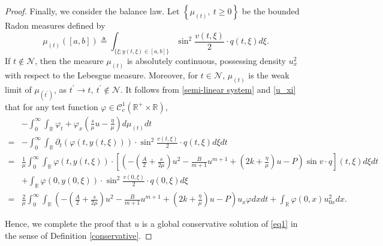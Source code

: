 \documentclass[10pt,a4paper]{amsart}
\begin{document}
\begin{proof}
		Finally, we consider the balance law. Let $\left\{\mu_{(t)},\ t\geq0\right\}$ be the bounded Radon measures defined by
		\begin{equation}
			\mu_{(t)}\left([a,b]\right)\triangleq\int_{\{\xi;y(t,\xi)\in[a,b]\}}\sin^2\frac{v(t,\xi)}{2}\cdot q(t,\xi)d\xi.
		\end{equation}
		If $t\notin\mathcal{N}$, then the measure $\mu_{(t)}$ is absolutely continuous, possessing density $u_x^2$ with respect to the Lebesgue measure. Moreover, for $t\in\mathcal{N}$, $\mu_{(t)}$ is the weak limit of $\mu_{(t^\prime)}$, as $t^\prime\to t,\ t^\prime\notin\mathcal{N}$. It follows from \eqref{semi-linear system} and \eqref{u_xi} that for any test function $\varphi\in\mathcal{C}_c^1(\mathbb{R}^+\times\mathbb{R})$,
		\begin{align*}
			&-\int_{0}^{\infty}\int_\mathbb{R}\varphi_t+\varphi_x\left(\frac{s}{\mu}u-\frac{\eta}{\mu}\right)d\mu_{(t)}dt\\
			=&-\int_{0}^{\infty}\int_\mathbb{R}\partial_t(\varphi(t,y(t,\xi)))\cdot\sin^2\frac{v(t,\xi)}{2}\cdot q(t,\xi)d\xi dt\\
			=&\frac{1}{\mu}\int_{0}^{\infty}\int_\mathbb{R}\varphi(t,y(t,\xi))\cdot\left[\left(-\left(\frac{A}{2}+\frac{s}{2\mu}\right)u^2-\frac{B}{m+1}u^{m+1}+\left(2k+\frac{\eta}{\mu}\right)u-P\right)\sin v\cdot q\right](t,\xi) d\xi dt\\
			&+\int_{\mathbb{R}}\varphi(0,y(0,\xi))\cdot\sin^2\frac{v(0,\xi)}{2}\cdot q(0,\xi)d\xi\\
			=&\frac{2}{\mu}\int_{0}^{\infty}\int_\mathbb{R}\left(-\left(\frac{A}{2}+\frac{s}{2\mu}\right)u^2-\frac{B}{m+1}u^{m+1}+\left(2k+\frac{\eta}{\mu}\right)u-P\right)u_x\varphi  dxdt+\int_{\mathbb{R}}\varphi(0,x)u_{0x}^{2}dx.
		\end{align*}	
		
		Hence, we complete the proof that $u$ is a global conservative solution of \eqref{eq1} in the sense of Definition \ref{conservative}.
	\end{proof}
\end{document}
